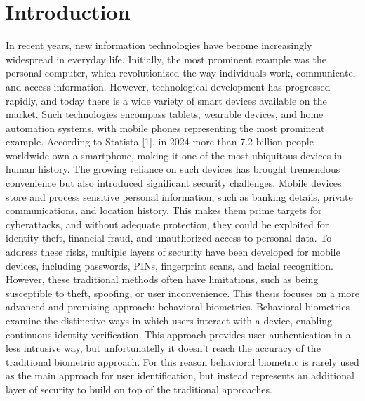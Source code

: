 \documentclass{article}
\begin{document}
\begin{abstract}
\setlength{\parindent}{0pt}
\setlength{\parskip}{0.7\baselineskip}
\noindent


\end{abstract}
\newpage

\section{Introduction}
\setlength{\parindent}{0pt}
\setlength{\parskip}{0.7\baselineskip}
In recent years, new information technologies have become increasingly widespread in everyday life. 
Initially, the most prominent example was the personal computer, which revolutionized the way individuals work, communicate, and access information.
However, technological development has progressed rapidly, and today there is a wide variety of smart devices available on the market.
Such technologies encompass tablets, wearable devices, and home automation systems, with mobile phones representing the most prominent example.
According to Statista [1], in 2024 more than 7.2 billion people worldwide own a smartphone, making it one of the most ubiquitous devices in human history.
The growing reliance on such devices has brought tremendous convenience but also introduced significant security challenges. 
Mobile devices store and process sensitive personal information, such as banking details, private communications, and location history. 
This makes them prime targets for cyberattacks, and without adequate protection, they could be exploited for identity theft, financial fraud, and unauthorized access to personal data.
To address these risks, multiple layers of security have been developed for mobile devices, including passwords, PINs, fingerprint scans, and facial recognition.
However, these traditional methods often have limitations, such as being susceptible to theft, spoofing, or user inconvenience. 
This thesis focuses on a more advanced and promising approach: behavioral biometrics.
Behavioral biometrics examine the distinctive ways in which users interact with a device, enabling continuous identity verification.
This approach provides user authentication in a less intrusive way, but unfortunatelly it doesn't reach the accuracy of the traditional biometric approach.
For this reason behavioral biometric is rarely used as the main approach for user identification, but instead represents an additional layer of security to build on top of the traditional approaches.


\newpage
\end{document}

